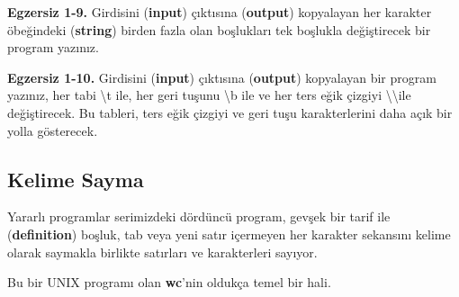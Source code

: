 \documentclass[a4paper,12pt,oneside]{book}
\begin{document}
\noindent \textbf{Egzersiz 1-9.} Girdisini (\textbf{input}) çıktısına (\textbf{output}) kopyalayan her karakter öbeğindeki (\textbf{string}) birden fazla olan boşlukları tek boşlukla değiştirecek bir program yazınız. \newline

\noindent \textbf{Egzersiz 1-10.} Girdisini (\textbf{input}) çıktısına (\textbf{output}) kopyalayan bir program yazınız, her tabi \textbackslash t ile, her geri tuşunu \textbackslash b ile ve her ters eğik çizgiyi \textbackslash \textbackslash ile değiştirecek. Bu tableri, ters eğik çizgiyi ve geri tuşu karakterlerini daha açık bir yolla gösterecek.

\subsection{Kelime Sayma}

\par Yararlı programlar serimizdeki dördüncü program, gevşek bir tarif ile (\textbf{definition}) boşluk, tab veya yeni satır içermeyen her karakter sekansını kelime olarak saymakla birlikte satırları ve karakterleri sayıyor. \pagebreak

\noindent Bu bir UNIX programı olan \textbf{wc}'nin oldukça temel bir hali.
\end{document}
